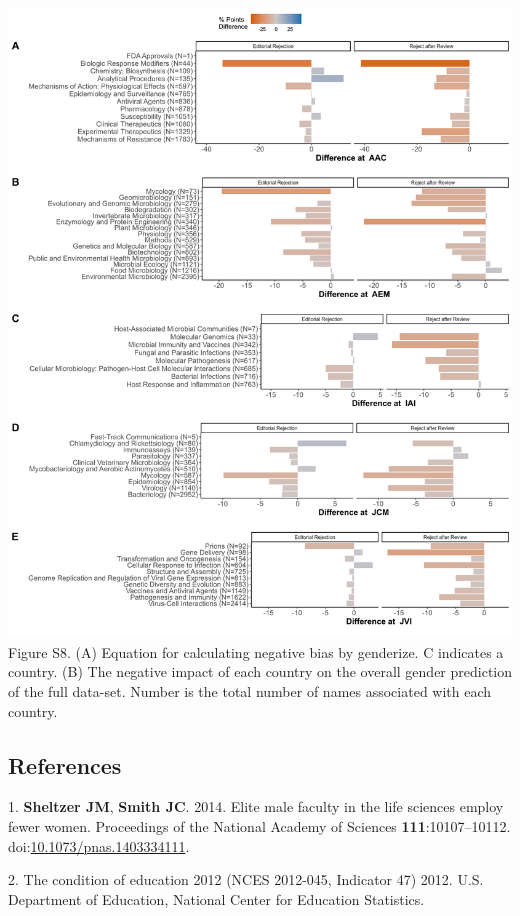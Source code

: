\documentclass[11pt,]{article}
\begin{document}
\newpage

\includegraphics{Figure_S8.png} Figure S8. (A) Equation for calculating
negative bias by genderize. C indicates a country. (B) The negative
impact of each country on the overall gender prediction of the full
data-set. Number is the total number of names associated with each
country.

\newpage

\subsection*{References}\label{references}

\hypertarget{refs}{}
\hypertarget{ref-sheltzer_elite_2014}{}
1. \textbf{Sheltzer JM}, \textbf{Smith JC}. 2014. Elite male faculty in
the life sciences employ fewer women. Proceedings of the National
Academy of Sciences \textbf{111}:10107--10112.
doi:\href{https://doi.org/10.1073/pnas.1403334111}{10.1073/pnas.1403334111}.

\hypertarget{ref-NCES_condition_2011}{}
2. The condition of education 2012 (NCES 2012-045, Indicator 47) 2012.
U.S. Department of Education, National Center for Education Statistics.
\end{document}
